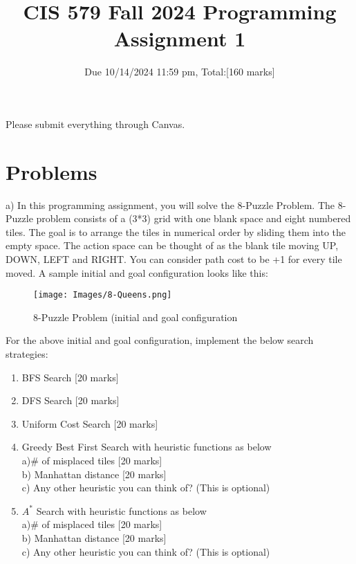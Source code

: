\documentclass{article}
\title{CIS 579 Fall 2024 Programming Assignment 1}
\author{Due 10/14/2024 11:59 pm, Total:[160 marks]}
\date{}
\begin{document}
\maketitle

\noindent Please submit everything through Canvas.\\
\section{Problems}
\noindent a) In this programming assignment, you will solve the 8-Puzzle Problem. The 8-Puzzle problem consists of a (3*3) grid with one blank space and eight numbered tiles. The goal is to arrange the tiles in numerical order by sliding them into the empty space. The action space can be thought of as the blank tile moving UP, DOWN, LEFT and RIGHT. You can consider path cost to be +1 for every tile moved. A sample initial and goal configuration looks like this:\\

\begin{figure}[ht]
    \centering
    \texttt{[image: Images/8-Queens.png]}
    \caption{8-Puzzle Problem (initial and goal configuration}
    \label{fig:STate-space}
\end{figure}

\noindent For the above initial and goal configuration, implement the below search strategies:\\
\begin{enumerate}
    \item BFS Search [20 marks]
    \item DFS Search [20 marks]
    \item Uniform Cost Search [20 marks]
    \item Greedy Best First Search with heuristic functions as below\\
     a)\# of misplaced tiles [20 marks]\\
     b) Manhattan distance [20 marks] \\
     c) Any other heuristic you can think of? (This is optional)\\
     \item $A^{*}$ Search with heuristic functions as below\\
     a)\# of misplaced tiles [20 marks] \\
     b) Manhattan distance  [20 marks]\\
     c) Any other heuristic you can think of? (This is optional)\\
\end{enumerate}
\end{document}
